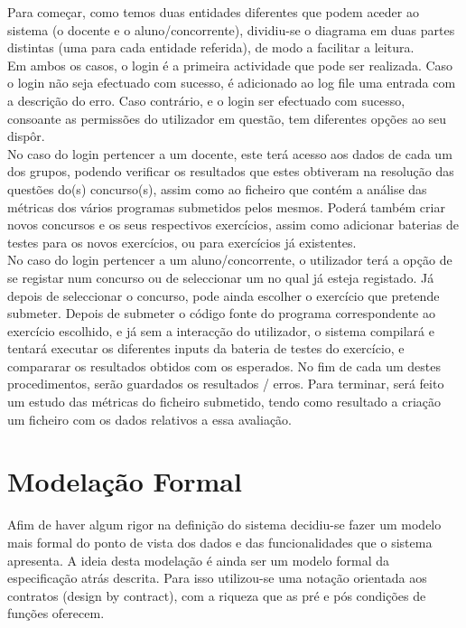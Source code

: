 Para começar, como temos duas entidades diferentes que podem aceder ao sistema (o docente e o aluno/concorrente), 
dividiu-se o diagrama em duas partes distintas (uma para cada entidade referida), de modo a facilitar a leitura.\\

Em ambos os casos, o login é a primeira actividade que pode ser realizada.
Caso o login não seja efectuado com sucesso, é adicionado ao log file uma entrada com a descrição do erro.
Caso contrário, e o login ser efectuado com sucesso, consoante as permissões do utilizador em questão, tem diferentes opções ao seu dispôr.\\

No caso do login pertencer a um docente, este terá acesso aos dados de cada um dos grupos, podendo verificar os resultados que estes 
obtiveram na resolução das questões do(s) concurso(s), assim como ao ficheiro que contém a análise das métricas dos vários programas submetidos 
pelos mesmos.
Poderá também criar novos concursos e os seus respectivos exercícios, assim como adicionar baterias de testes para os novos exercícios, 
ou para exercícios já existentes.\\

No caso do login pertencer a um aluno/concorrente, o utilizador terá a opção de se registar num concurso ou de seleccionar um no qual já 
esteja registado.
Já depois de seleccionar o concurso, pode ainda escolher o exercício que pretende submeter.
Depois de submeter o código fonte do programa correspondente ao exercício escolhido, e já sem a interacção do utilizador, 
o sistema compilará e tentará executar os diferentes inputs da bateria de testes do exercício, e compararar os resultados obtidos com os esperados.
No fim de cada um destes procedimentos, serão guardados os resultados / erros.
Para terminar, será feito um estudo das métricas do ficheiro submetido, tendo como resultado a criação um ficheiro com os dados relativos a essa avaliação.\\

\section{Modelação Formal}\label{sec modfor}

Afim de haver algum rigor na definição do sistema decidiu-se fazer um modelo mais formal do ponto de vista dos dados e das funcionalidades que o sistema apresenta.
A ideia desta modelação é ainda ser um modelo formal da especificação atrás descrita. Para isso utilizou-se uma notação orientada aos contratos (design by contract),
com a riqueza que as pré e pós condições de funções oferecem.\\

